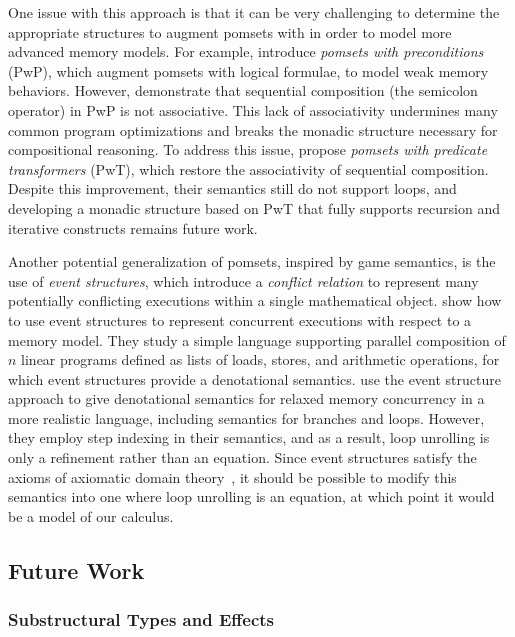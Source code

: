 \documentclass[acmsmall,screen,review]{acmart}
\begin{document}
One issue with this approach is that it can be very challenging to determine the appropriate
structures to augment pomsets with in order to model more advanced memory models. For example,
\citet{jagadeesan-pwp-20} introduce \emph{pomsets with preconditions} (PwP), which augment pomsets
with logical formulae, to model weak memory behaviors. However, \citet{leaky-semicolon} demonstrate
that sequential composition (the semicolon operator) in PwP is not associative. This lack of
associativity undermines many common program optimizations and breaks the monadic structure
necessary for compositional reasoning. To address this issue, \citet{leaky-semicolon} propose
\emph{pomsets with predicate transformers} (PwT), which restore the associativity of sequential
composition. Despite this improvement, their semantics still do not support loops, and developing a
monadic structure based on PwT that fully supports recursion and iterative constructs remains future
work. 

Another potential generalization of pomsets, inspired by game semantics, is the use of \emph{event
structures}, which introduce a \emph{conflict relation} to represent many potentially conflicting
executions within a single mathematical object. \citet{castellan-16} show how to use event
structures to represent concurrent executions with respect to a memory model. They study a simple
language supporting parallel composition of $n$ linear programs defined as lists of loads, stores,
and arithmetic operations, for which event structures provide a denotational semantics.
\citet{paviotti-modular-relaxed-dep-20} use the event structure approach to give denotational
semantics for relaxed memory concurrency in a more realistic language, including semantics for
branches and loops. However, they employ step indexing in their semantics, and as a result, loop
unrolling is only a refinement rather than an equation. Since event structures satisfy the axioms of
axiomatic domain theory~\cite{fiore-phd-94}, it should be possible to modify this semantics into one
where loop unrolling is an equation, at which point it would be a model of our calculus.

\subsection{Future Work}

\subsubsection{Substructural Types and Effects}
\end{document}
